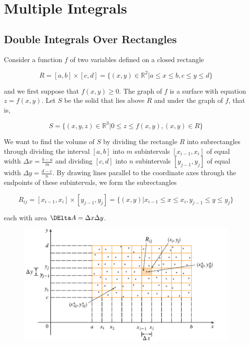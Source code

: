 \section{Multiple Integrals}

    \subsection{Double Integrals Over Rectangles}   %

        Consider a function $f$ of two variables defined on a closed rectangle

        \[
            R = [a,b] \times [c,d] = \{(x,y) \in \mathbb{R}^2\Big | a \leq x \leq b, c \leq y \leq d\}
        \]

        and we first suppose that $f(x,y) \geq 0$. The graph of $f$ is a surface with equation $z=f(x,y)$. Let $S$ be the solid that lies above $R$ and under the graph of $f$, that is,

        \[
            S = \{(x,y,z) \in \mathbb{R}^3 \Big| 0 \leq z \leq f(x,y), (x,y)\in R \}
        \]

        We want to find the volume of $S$ by dividing the rectangle $R$ into subrectangles through dividing the interval $[a,b]$ into $m$ subintervals $[x_{i-1}, x_i]$ of equal width $\Delta x = \frac{b-a}{m}$ and
        dividing $[c,d]$ into $n$ subintervals $[y_{j-1}, y_j]$ of equal width $\Delta y = \frac{d-c}{n}$. By drawing lines parallel to the coordinate axes through the endpoints of these subintervals, we form the
        subrectangles

        \[
            R_{ij} = [x_{i-1}, x_i] \times [y_{j-1}, y_j] = \{(x,y) \Big| x_{i-1} \leq x \leq x_i, y_{j-1} \leq y \leq y_j\}
        \]

        each with area $\DElta A = \Delta x \Delta y$.

        \begin{figure}[hbt!]
            \centering
            \includegraphics[scale = 0.75]{Resources/15.1_Subrectangles}
        \end{figure}

